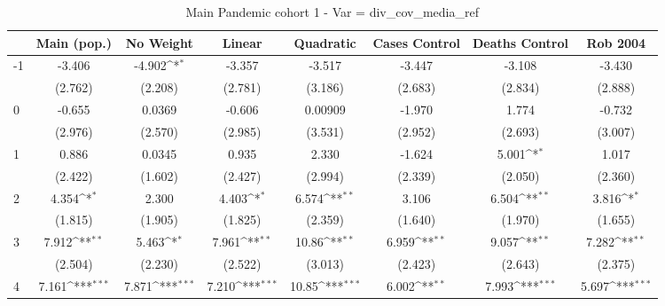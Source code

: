 \documentclass{article}
\begin{document}
{
\def\sym#1{\ifmmode^{#1}\else\(^{#1}\)\fi}
\begin{longtable}{l*{7}{c}}
\caption{Main Pandemic cohort 1 - Var = div\_cov\_media\_ref}\\
\hline\hline\endfirsthead\hline\endhead\hline\endfoot\endlastfoot
                &\multicolumn{1}{c}{Main (pop.)}&\multicolumn{1}{c}{No Weight}&\multicolumn{1}{c}{Linear}&\multicolumn{1}{c}{Quadratic}&\multicolumn{1}{c}{Cases Control}&\multicolumn{1}{c}{Deaths Control}&\multicolumn{1}{c}{Rob 2004}\\
\hline
-1              &   -3.406         &   -4.902\sym{*}  &   -3.357         &   -3.517         &   -3.447         &   -3.108         &   -3.430         \\
                &  (2.762)         &  (2.208)         &  (2.781)         &  (3.186)         &  (2.683)         &  (2.834)         &  (2.888)         \\
0               &   -0.655         &   0.0369         &   -0.606         &  0.00909         &   -1.970         &    1.774         &   -0.732         \\
                &  (2.976)         &  (2.570)         &  (2.985)         &  (3.531)         &  (2.952)         &  (2.693)         &  (3.007)         \\
1               &    0.886         &   0.0345         &    0.935         &    2.330         &   -1.624         &    5.001\sym{*}  &    1.017         \\
                &  (2.422)         &  (1.602)         &  (2.427)         &  (2.994)         &  (2.339)         &  (2.050)         &  (2.360)         \\
2               &    4.354\sym{*}  &    2.300         &    4.403\sym{*}  &    6.574\sym{**} &    3.106         &    6.504\sym{**} &    3.816\sym{*}  \\
                &  (1.815)         &  (1.905)         &  (1.825)         &  (2.359)         &  (1.640)         &  (1.970)         &  (1.655)         \\
3               &    7.912\sym{**} &    5.463\sym{*}  &    7.961\sym{**} &    10.86\sym{**} &    6.959\sym{**} &    9.057\sym{**} &    7.282\sym{**} \\
                &  (2.504)         &  (2.230)         &  (2.522)         &  (3.013)         &  (2.423)         &  (2.643)         &  (2.375)         \\
4               &    7.161\sym{***}&    7.871\sym{***}&    7.210\sym{***}&    10.85\sym{***}&    6.002\sym{**} &    7.993\sym{***}&    5.697\sym{***}\\

\end{longtable}}
\end{document}

